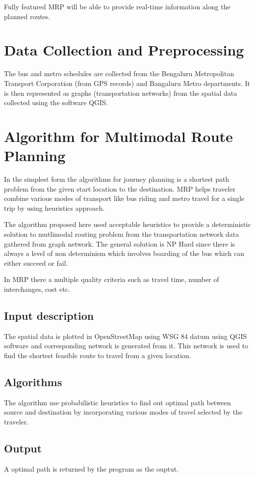 \documentclass[12pt,a4paper]{article}
\begin{document}
Fully featured MRP will be able to provide real-time information along the planned routes.

\section{Data Collection and Preprocessing}

The bus and metro schedules are collected from the Bengaluru Metropolitan Transport Corporation (from GPS records) and Bangaluru Metro departments. It is then represented as graphs (transportation networks) from the spatial data collected using the software QGIS. 


\section{Algorithm for Multimodal Route Planning}

In the simplest form the algorithms for journey planning is a shortest path problem from the given start location to the destination. MRP helps traveler combine various modes of transport like bus riding and metro travel for a single trip by using heuristics approach. 

The algorithm proposed here used acceptable heuristics to provide a deterministic solution to mutlimodal routing problem from the transportation network data gathered from  graph network. The general solution is NP Hard since there is always a level of non determinism which involves boarding of the bus which can either succeed or fail.

In MRP there a multiple quality criteria such as travel time, number of interchanges, cost etc.

\subsection{Input description}
The spatial data is plotted in OpenStreetMap using WSG 84 datum using QGIS software and corresponding network is generated from it. This network is used to find the shortest feasible route to travel from a given location.
\subsection{Algorithms}
The algorithm use probabilistic heuristics to find out optimal path between source and destination by incorporating various modes of travel selected by the traveler.

\subsection{Output}
A optimal path is returned by the program as the ouptut.
\end{document}
